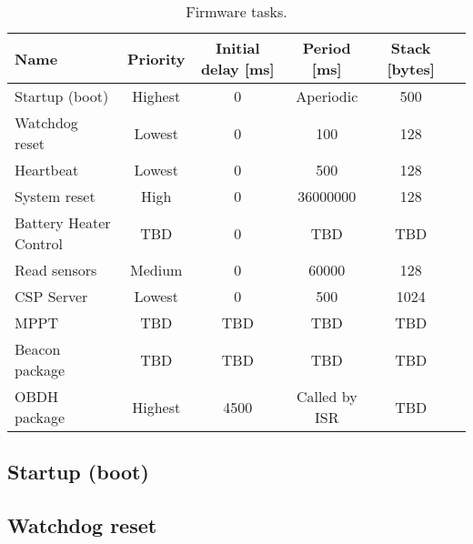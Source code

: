 \begin{table}[!h]
    \centering
    \begin{tabular}{lccccc}
        \toprule[1.5pt]
        \textbf{Name}          & \textbf{Priority} & \textbf{Initial delay [ms]} & \textbf{Period [ms]} & \textbf{Stack [bytes]} \\
        \midrule
        Startup (boot)         & Highest           & 0                           & Aperiodic            & 500                    \\
        Watchdog reset         & Lowest            & 0                           & 100                  & 128                    \\
        Heartbeat              & Lowest            & 0                           & 500                  & 128                    \\
        System reset           & High              & 0                           & 36000000             & 128                    \\
        Battery Heater Control & TBD               & 0                           & TBD                  & TBD                    \\
        Read sensors           & Medium            & 0                           & 60000                & 128                    \\
        CSP Server             & Lowest            & 0                           & 500                  & 1024                   \\
        MPPT                   & TBD               & TBD                         & TBD                  & TBD                    \\
        Beacon package         & TBD               & TBD                         & TBD                  & TBD                    \\
        OBDH package           & Highest           & 4500   & Called by ISR\nomenclature{\textbf{ISR}}{\textit{Interrupt Service Routine.}}   & TBD \\
        \bottomrule[1.5pt]
    \end{tabular}
    \caption{Firmware tasks.}
    \label{tab:firmware-tasks}
\end{table}

\subsection{Startup (boot)}

\subsection{Watchdog reset}

